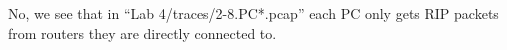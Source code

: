 No, we see that in ``Lab 4/traces/2-8.PC*.pcap'' each PC only gets RIP packets from routers they are directly connected to.
